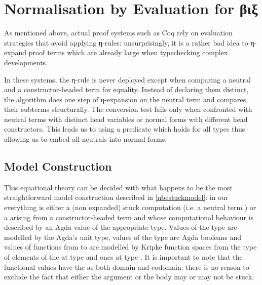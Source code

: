 
\section{Normalisation by Evaluation for βιξ}

As mentioned above, actual proof systems such as Coq rely on evaluation
strategies that avoid applying η-rules: unsurprisingly, it is a rather
bad idea to η-expand proof terms which are already large when typechecking
complex developments.

In these systems, the η-rule is never deployed except when comparing a
neutral and a constructor-headed term for equality. Instead of declaring
them distinct, the algorithm does one step of η-expansion on the
neutral term and compares their subterms structurally. The conversion test
fails only when confronted with neutral terms with distinct head
variables or normal forms with different head constructors.
This leads us to using a predicate  which holds for all types
thus allowing us to embed all neutrals into normal forms.

\subsection{Model Construction}

This equational theory can be decided with what happens to be the most
straightforward model construction described in \cref{nbestuckmodel}:
in our  everything is either a (non expanded) stuck computation
(i.e. a neutral term ) or a  arising from a constructor-headed
term and whose computational behaviour is described by an Agda value of the
appropriate type.
%
Values of the  type are modelled by the Agda's unit type, values
of the  type are Agda booleans and values of functions from 
to  are modelled by Kripke function spaces from the type of elements of
the  at type  and ones at type .
%
It is important to note that the functional values have the  as both
domain and codomain: there is no reason to exclude the fact that either the
argument or the body may or may not be stuck.


